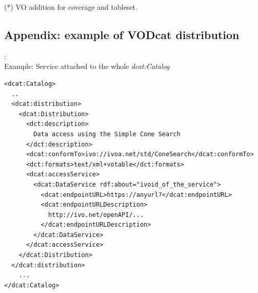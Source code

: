 \documentclass[11pt,a4paper]{ivoa}
\begin{document}
(*) VO addition for coverage and tableset.


\subsection{Appendix: example of VODcat distribution}:\\

Example: Service attached to the whole \textit{dcat:Catalog}


\begin{lstlisting}
<dcat:Catalog>
  ..
  <dcat:distribution>
	<dcat:Distribution>
	  <dct:description>
		Data access using the Simple Cone Search
	  </dct:description>
	  <dcat:conformTo>ivo://ivoa.net/std/ConeSearch</dcat:conformTo>
	  <dct:formats>text/xml+votable</dct:formats>
	  <dcat:accessService>
		<dcat:DataService rdf:about="ivoid_of_the_service">
		  <dcat:endpointURL>https://anyurl?</dcat:endpointURL>
		  <dcat:endpointURLDescription>
			http://ivo.net/openAPI/...
		  </dcat:endpointURLDescription>
		</dcat:DataService>
	  </dcat:accessService>
	</dcat:Distribution>
  </dcat:distribution>
	...
</dcat:Catalog>
\end{lstlisting}



\end{document}
